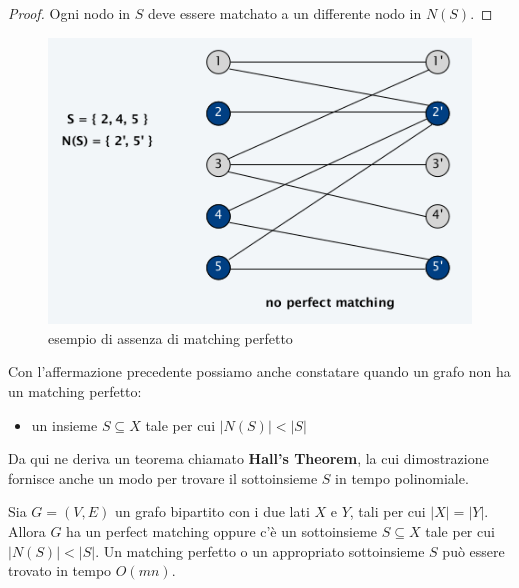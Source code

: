 \begin{proof}
	Ogni nodo in $S$ deve essere matchato a un
	differente nodo in $N(S)$.
\end{proof}

\begin{figure}[H]
	\centering
	\includegraphics[width = 10 cm]{capitoli/network_flow/imgs/bipartite2.png}
	\caption{esempio di assenza di matching perfetto}
\end{figure}

Con l'affermazione precedente possiamo anche constatare quando un grafo
non ha un matching perfetto:
\begin{itemize}
	\item un insieme $S \subseteq X$ tale per cui $|N(S)| < |S|$
\end{itemize}

Da qui ne deriva un teorema chiamato \textbf{Hall's Theorem}, la cui
dimostrazione fornisce anche un modo per trovare il sottoinsieme $S$
in tempo polinomiale.

\begin{myblockquote}
	\begin{minipage}{\textwidth}
		\begin{theorem}
			Sia $G=(V, E)$ un grafo bipartito con i due lati $X$ e $Y$, tali
			per cui $|X| = |Y|$. Allora $G$ ha un perfect matching oppure c'è un
			sottoinsieme $S \subseteq X$ tale per cui $|N(S)| < |S|$. Un
			matching perfetto o un appropriato sottoinsieme $S$ può essere trovato
			in tempo $O(mn)$.
		\end{theorem}
	\end{minipage}
\end{myblockquote}

